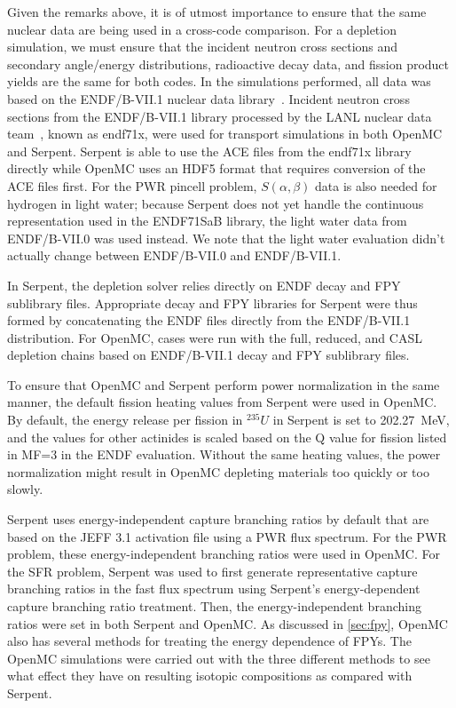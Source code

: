 \documentclass[3p,authoryear]{elsarticle}
\begin{document}
Given the remarks above, it is of utmost importance to ensure that the same
nuclear data are being used in a cross-code comparison. For a depletion
simulation, we must ensure that the incident neutron cross sections and
secondary angle/energy distributions, radioactive decay data, and fission
product yields are the same for both codes. In the simulations performed, all
data was based on the ENDF/B-VII.1 nuclear data library~\citep{chadwick2011nds}.
Incident neutron cross sections from the ENDF/B-VII.1 library processed by the
LANL nuclear data team~\citep{conlin2013lanl}, known as endf71x, were used for
transport simulations in both OpenMC and Serpent. Serpent is able to use the ACE
files from the endf71x library directly while OpenMC uses an HDF5 format that
requires conversion of the ACE files first. For the PWR pincell problem,
$S(\alpha,\beta)$ data is also needed for hydrogen in light water; because
Serpent does not yet handle the continuous representation used in the ENDF71SaB
library, the light water data from ENDF/B-VII.0 was used instead. We note that
the light water evaluation didn't actually change between ENDF/B-VII.0 and
ENDF/B-VII.1.

In Serpent, the depletion solver relies directly on ENDF decay and FPY
sublibrary files. Appropriate decay and FPY libraries for Serpent were thus
formed by concatenating the ENDF files directly from the ENDF/B-VII.1
distribution. For OpenMC, cases were run with the full, reduced, and CASL
depletion chains based on ENDF/B-VII.1 decay and FPY sublibrary files.

To ensure that OpenMC and Serpent perform power normalization in the same
manner, the default fission heating values from Serpent were used in OpenMC. By
default, the energy release per fission in $^{235}U$ in Serpent is set to
\SI{202.27}{\mega\electronvolt}, and the values for other actinides is scaled
based on the Q value for fission listed in MF=3 in the ENDF evaluation. Without
the same heating values, the power normalization might result in OpenMC
depleting materials too quickly or too slowly.

Serpent uses energy-independent capture branching ratios by default that are
based on the JEFF 3.1 activation file using a PWR flux spectrum. For the PWR
problem, these energy-independent branching ratios were used in OpenMC. For the
SFR problem, Serpent was used to first generate representative capture branching
ratios in the fast flux spectrum using Serpent's energy-dependent capture
branching ratio treatment. Then, the energy-independent branching ratios were
set in both Serpent and OpenMC. As discussed in \cref{sec:fpy}, OpenMC also has
several methods for treating the energy dependence of FPYs. The OpenMC
simulations were carried out with the three different methods to see what effect
they have on resulting isotopic compositions as compared with Serpent.
\end{document}
